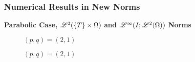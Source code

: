 \begin{frame}
    \frametitle{Numerical Results in New Norms}

    \vspace*{\fill}
    \begin{center}
        {\color{\accentcolor} \Large \textbf{Parabolic Case, $\mathscr{L}^{2}(\left\{ T \right\} \times \Omega)$ and $\mathscr{L}^{\infty}(I; \mathscr{L}^{2}(\Omega))$ Norms}}
    \end{center}

    \vspace*{\fill}

    \begin{multicols}{2}

        \begin{center}
            \begin{minipage}{0.45\textwidth}
                \begin{figure}[!ht]
                    \caption{$\left( p, q  \right) = \left( 2, 1  \right)$}
                    \label{fig:p_2_1_par_l2T}
                    
                \end{figure}
            \end{minipage}
        \end{center}
        \vspace*{\fill}

        \vfill\null
        \columnbreak

        \begin{center}
            \begin{minipage}{0.45\textwidth}
                \begin{figure}[!ht]
                    \caption{$\left( p, q  \right) = \left( 2, 1  \right)$}
                    \label{fig:p_2_1_par_linfl2}
                    
                \end{figure}
            \end{minipage}
        \end{center}
        \vspace*{\fill}

    \end{multicols}
    \vspace*{\fill}
    
\end{frame}

